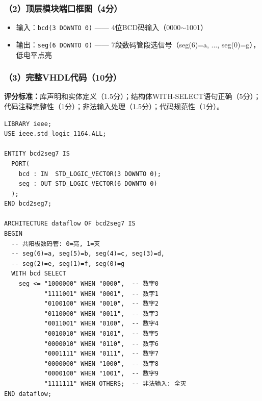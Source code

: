 \subsubsection{（2）顶层模块端口框图（4分）}

\begin{center}
\end{center}

\begin{itemize}
\item 输入：\texttt{bcd(3 DOWNTO 0)} —— 4位BCD码输入（0000$\sim$1001）
\item 输出：\texttt{seg(6 DOWNTO 0)} —— 7段数码管段选信号（seg(6)=a, ..., seg(0)=g），低电平点亮
\end{itemize}

\subsubsection{（3）完整VHDL代码（10分）}

\begin{framed}
\textbf{评分标准：}库声明和实体定义（1.5分）；结构体WITH-SELECT语句正确（5分）；代码注释完整性（1分）；非法输入处理（1.5分）；代码规范性（1分）。
\end{framed}

\begin{lstlisting}[language=VDL, caption={BCD码转7段数码管译码器VHDL代码——数据流描述}]
LIBRARY ieee;
USE ieee.std_logic_1164.ALL;

ENTITY bcd2seg7 IS
  PORT(
    bcd : IN  STD_LOGIC_VECTOR(3 DOWNTO 0);
    seg : OUT STD_LOGIC_VECTOR(6 DOWNTO 0)
  );
END bcd2seg7;

ARCHITECTURE dataflow OF bcd2seg7 IS
BEGIN
  -- 共阳极数码管: 0=亮, 1=灭
  -- seg(6)=a, seg(5)=b, seg(4)=c, seg(3)=d,
  -- seg(2)=e, seg(1)=f, seg(0)=g
  WITH bcd SELECT
    seg <= "1000000" WHEN "0000",  -- 数字0
           "1111001" WHEN "0001",  -- 数字1
           "0100100" WHEN "0010",  -- 数字2
           "0110000" WHEN "0011",  -- 数字3
           "0011001" WHEN "0100",  -- 数字4
           "0010010" WHEN "0101",  -- 数字5
           "0000010" WHEN "0110",  -- 数字6
           "0001111" WHEN "0111",  -- 数字7
           "0000000" WHEN "1000",  -- 数字8
           "0000100" WHEN "1001",  -- 数字9
           "1111111" WHEN OTHERS;  -- 非法输入: 全灭
END dataflow;
\end{lstlisting}

